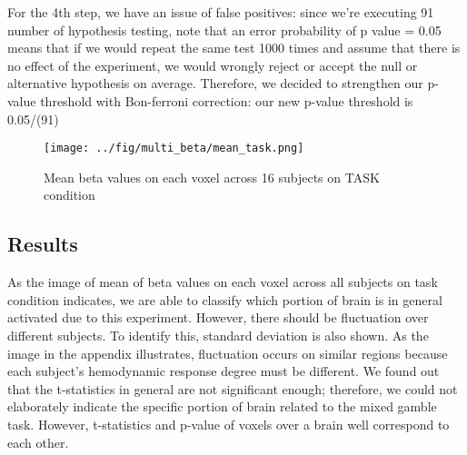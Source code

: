 For the 4th step, we have an issue of false positives: since we're executing 91 number
of hypothesis testing, note that an error probability of p value = 0.05 means that if we would 
repeat the same test 1000 times and assume that there is no effect of the experiment, we would
wrongly reject or accept the null or alternative hypothesis on average. Therefore, we decided 
to strengthen our p-value threshold with Bon-ferroni correction: our new p-value threshold is 
0.05/(91)

\begin{figure}[H] 
\centering \texttt{[image: ../fig/multi\_beta/mean\_task.png]}	 
\caption{Mean beta values on each voxel across 16 subjects on TASK condition}
\end{figure} 


\subsection {Results}
As the image of mean of beta values on each voxel across all subjects on task condition indicates, 
we are able to classify which portion of brain is in general activated due to this experiment. 
However, there should be fluctuation over different subjects. To identify this, standard deviation 
is also shown. As the image in the appendix illustrates, fluctuation occurs on similar regions 
because each subject's hemodynamic response degree must be different. We found out that the 
t-statistics in general are not significant enough; therefore, we could not elaborately indicate 
the specific portion of brain related to the mixed gamble task. However, t-statistics and p-value 
of voxels over a brain well correspond to each other.





